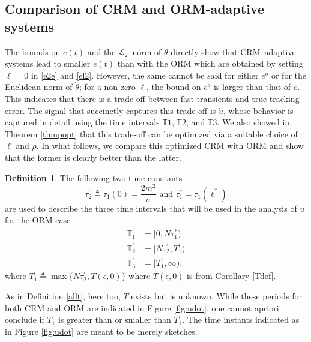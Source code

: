 \documentclass[10pt,journal]{IEEEtran}
\theoremstyle{plain}%
\theoremstyle{definition}
\newtheorem{defn}{Definition}%
\newcommand{\be}[0]{\begin{equation}}
\newcommand{\ee}[0]{\end{equation}}
\begin{document}
\subsection{Comparison of CRM and ORM-adaptive systems}\label{sqwe}
The bounds on  $e(t)$ and the $\mathcal L_2$--norm of $\dot\theta$ directly show that CRM--adaptive systems lead to smaller $e(t)$ than with the ORM which are obtained by setting $\ell=0$ in \eqref{e2e} and \eqref{el2}. However, the same cannot be said for either $e^o$ or for the Euclidean norm of $\dot\theta$; for a non-zero $\ell$, the bound on $e^o$ is larger than that of $e$.  This indicates that there is a trade-off between fast transients and true tracking error. The signal that succinctly captures this trade off is $\dot u$, whose behavior is captured in detail using the time intervals $\mathbb T1$, $\mathbb T2$, and $\mathbb T3$. We also showed in Theorem \ref{thmpopt} that this trade-off can be optimized via a suitable choice of $\ell$ and $\rho$. In what follows, we compare this optimized CRM with ORM and show that the former is clearly better than the latter.

\begin{defn}The following two time constants 
\be
\tau_2^\prime\triangleq  \tau_1(0)=\frac{2m^2}{\sigma} \text{ and } \tau_1^* = \tau_1(\ell^*) 
\ee
are used to describe the three time intervals that will be used in the analysis of $\dot u$ for the ORM case
\be
\begin{split}
\mathbb T_1^\prime &= [0,N\tau_1^*)\\ 
\mathbb T_2^\prime &= [N\tau_2^\prime,T_1^\prime)\\
\mathbb T_3^\prime &= [T_1^\prime,\infty). \end{split}
\ee
where $T_1^\prime\triangleq\max\{N\tau^\prime_2, T(\epsilon,0)\}$ where $T(\epsilon,0)$ is from Corollary \ref{Tdef}.\end{defn}

As in Definition \ref{allt}, here too, $T$ exists but is unknown. While these periods for both CRM and ORM are indicated in Figure \ref{fig:udot}, one cannot apriori conclude if $T_1$ is greater than or smaller than $T_1^\prime$. The time instants indicated as in Figure \ref{fig:udot} are meant to be merely sketches.
\end{document}
